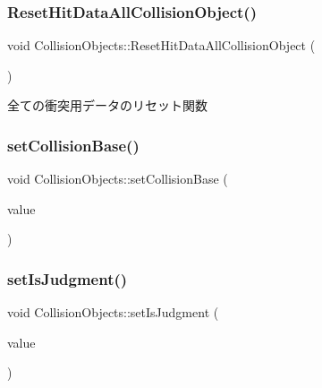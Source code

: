 \subsubsection{\texorpdfstring{Reset\+Hit\+Data\+All\+Collision\+Object()}{ResetHitDataAllCollisionObject()}}
{\footnotesize\ttfamily void Collision\+Objects\+::\+Reset\+Hit\+Data\+All\+Collision\+Object (\begin{DoxyParamCaption}{ }\end{DoxyParamCaption})\hspace{0.3cm}{\ttfamily [inline]}}



全ての衝突用データのリセット関数 

\mbox{\label{class_collision_objects_a144f0c9160c0dda1579c26a0726fdbb6}} 
\subsubsection{\texorpdfstring{set\+Collision\+Base()}{setCollisionBase()}}
{\footnotesize\ttfamily void Collision\+Objects\+::set\+Collision\+Base (\begin{DoxyParamCaption}\item[{\mbox{\hyperlink{class_collision_base}{Collision\+Base}} $\ast$}]{value }\end{DoxyParamCaption})\hspace{0.3cm}{\ttfamily [inline]}}

\mbox{\label{class_collision_objects_a61e67c1c0ea20a01d9e4a5b2d1b45428}} 
\subsubsection{\texorpdfstring{set\+Is\+Judgment()}{setIsJudgment()}}
{\footnotesize\ttfamily void Collision\+Objects\+::set\+Is\+Judgment (\begin{DoxyParamCaption}\item[{bool}]{value }\end{DoxyParamCaption})\hspace{0.3cm}{\ttfamily [inline]}}

